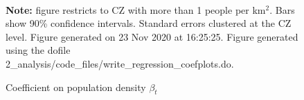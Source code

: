 \begin{figure}[!h]
\centering
\caption{Coefficient on population density $ \beta_t $}
\label{figure:baseline_gradients}
  \\ 
\par \begin{minipage}[h]{\textwidth}{\tiny\textbf{Note:} figure restricts to CZ with more than 1 people per km$^2$. Bars show 90\% confidence intervals. Standard errors clustered at the CZ level. Figure generated on 23 Nov 2020 at 16:25:25. Figure generated using the dofile 2\_analysis/code\_files/write\_regression\_coefplots.do.}\end{minipage}
\end{figure}
